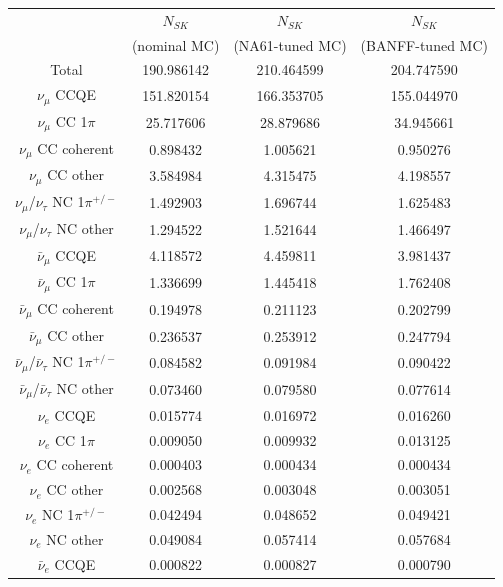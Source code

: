 %
%
\begin{table}
\centering
\begin{tabular}{| c | c | c | c | }
\hline
       & $N_{SK}$     & $N_{SK}$         & $N_{SK}$                      \\
       & (nominal MC) & (NA61-tuned MC)  & (BANFF-tuned MC)  \\
\hline
Total & 190.986142 & 210.464599 &  204.747590 \\
\hline
$\nu_\mu$ CCQE &      151.820154 & 166.353705 & 155.044970 \\
$\nu_\mu$ CC 1$\pi$ &       25.717606 & 28.879686 & 34.945661 \\
$\nu_\mu$ CC coherent &        0.898432 & 1.005621 & 0.950276 \\
$\nu_\mu$ CC other &        3.584984 & 4.315475 & 4.198557 \\
$\nu_\mu$/$\nu_\tau$ NC 1$\pi^{+/-}$ &        1.492903 & 1.696744 & 1.625483 \\
$\nu_\mu$/$\nu_\tau$ NC other &        1.294522 & 1.521644 & 1.466497 \\
$\bar{\nu}_{\mu}$ CCQE &        4.118572 & 4.459811 & 3.981437 \\
$\bar{\nu}_{\mu}$ CC 1$\pi$ &        1.336699 & 1.445418 & 1.762408 \\
$\bar{\nu}_{\mu}$ CC coherent &        0.194978 & 0.211123 & 0.202799 \\
$\bar{\nu}_{\mu}$ CC other &        0.236537 & 0.253912 & 0.247794 \\
$\bar{\nu}_{\mu}$/$\bar{\nu}_{\tau}$ NC 1$\pi^{+/-}$ &        0.084582 & 0.091984 & 0.090422 \\
$\bar{\nu}_{\mu}$/$\bar{\nu}_{\tau}$ NC other &        0.073460 & 0.079580 & 0.077614 \\
$\nu_e$ CCQE &        0.015774 & 0.016972 & 0.016260 \\
$\nu_e$ CC 1$\pi$ &        0.009050 & 0.009932 & 0.013125 \\
$\nu_e$ CC coherent &        0.000403 & 0.000434 & 0.000434 \\
$\nu_e$ CC other &        0.002568 & 0.003048 & 0.003051 \\
$\nu_e$ NC 1$\pi^{+/-}$ &        0.042494 & 0.048652 & 0.049421 \\
$\nu_e$ NC other &        0.049084 & 0.057414 & 0.057684 \\
$\bar{\nu}_{e}$ CCQE &        0.000822 & 0.000827 & 0.000790 \\

\end{tabular}
\end{table}
